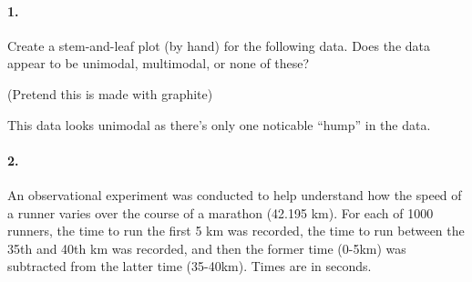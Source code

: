 

\usepackage[]{mdframed}


\renewcommand\classname{STAT F300 Statistics, Dr. Short}

\renewcommand\assignment{Worksheet 1, due Friday January 20, 4:15pm}



    \paragraph*{1.} 
    Create a stem-and-leaf plot (by hand) for the following data. Does the data appear to be unimodal, multimodal, or none of these?

    \begin{mdframed}
    \begin{center}
        (Pretend this is made with graphite)
    \end{center}
    
    This data looks unimodal as there's only one noticable ``hump'' in the data.
    \end{mdframed}

    \paragraph*{2.}

    An observational experiment was conducted to help understand how the speed of a runner varies over the course of a marathon (42.195 km). For each of 1000 runners, the time to run the first 5 km was recorded, the time to run between the 35th and 40th km was recorded, and then the former time (0-5km) was subtracted from the latter time (35-40km). Times are in seconds.

